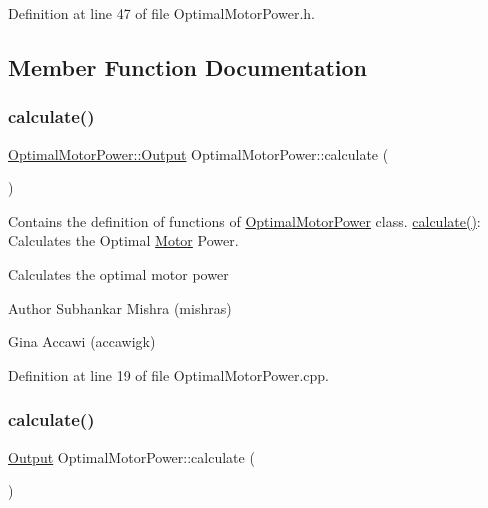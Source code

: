 Definition at line 47 of file Optimal\+Motor\+Power.\+h.



\subsection{Member Function Documentation}
\mbox{\label{class_optimal_motor_power_aa9f5364de1af6fd5c038b98e8509b1fb}} 
\subsubsection{\texorpdfstring{calculate()}{calculate()}\hspace{0.1cm}{\footnotesize\ttfamily [1/3]}}
{\footnotesize\ttfamily \hyperlink{struct_optimal_motor_power_1_1_output}{Optimal\+Motor\+Power\+::\+Output} Optimal\+Motor\+Power\+::calculate (\begin{DoxyParamCaption}{ }\end{DoxyParamCaption})}



Contains the definition of functions of \hyperlink{class_optimal_motor_power}{Optimal\+Motor\+Power} class. \hyperlink{class_optimal_motor_power_aa9f5364de1af6fd5c038b98e8509b1fb}{calculate()}\+: Calculates the Optimal \hyperlink{struct_motor}{Motor} Power. 

Calculates the optimal motor power

\begin{DoxyAuthor}{Author}
Subhankar Mishra (mishras) 

Gina Accawi (accawigk) 
\end{DoxyAuthor}


Definition at line 19 of file Optimal\+Motor\+Power.\+cpp.

\mbox{\label{class_optimal_motor_power_ab756397f68c530172d4fdd5ce8d2d27d}} 
\subsubsection{\texorpdfstring{calculate()}{calculate()}\hspace{0.1cm}{\footnotesize\ttfamily [2/3]}}
{\footnotesize\ttfamily \hyperlink{struct_optimal_motor_power_1_1_output}{Output} Optimal\+Motor\+Power\+::calculate (\begin{DoxyParamCaption}{ }\end{DoxyParamCaption})}

